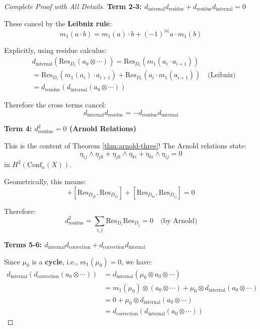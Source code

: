 \begin{proof}[Complete Proof with All Details]
\textbf{Term 2-3: $d_{\text{internal}} d_{\text{residue}} + d_{\text{residue}} d_{\text{internal}} = 0$}

These cancel by the \textbf{Leibniz rule}:
\begin{equation}
m_1(a \cdot b) = m_1(a) \cdot b + (-1)^{|a|} a \cdot m_1(b)
\end{equation}

Explicitly, using residue calculus:
\begin{align}
&d_{\text{internal}}(\text{Res}_{D_i}(a_0 \otimes \cdots)) 
= \text{Res}_{D_i}(m_1(a_i \cdot a_{i+1})) \\
&= \text{Res}_{D_i}(m_1(a_i) \cdot a_{i+1}) + \text{Res}_{D_i}(a_i \cdot m_1(a_{i+1})) 
\quad \text{(Leibniz)} \\
&= d_{\text{residue}}(d_{\text{internal}}(a_0 \otimes \cdots))
\end{align}

Therefore the cross terms cancel: 
$$d_{\text{internal}} d_{\text{residue}} = - d_{\text{residue}} d_{\text{internal}}$$

\textbf{Term 4: $d_{\text{residue}}^2 = 0$ (Arnold Relations)}

This is the content of Theorem \ref{thm:arnold-three}! The Arnold relations state:
\begin{equation}
\eta_{ij} \wedge \eta_{jk} + \eta_{jk} \wedge \eta_{ki} + \eta_{ki} \wedge \eta_{ij} = 0
\end{equation}
in $H^2(\text{Conf}_n(X))$.

Geometrically, this means:
\begin{equation}
[\text{Res}_{D_{ij}}, \text{Res}_{D_{jk}}] + [\text{Res}_{D_{jk}}, \text{Res}_{D_{ki}}] 
+ [\text{Res}_{D_{ki}}, \text{Res}_{D_{ij}}] = 0
\end{equation}

Therefore:
$$d_{\text{residue}}^2 = \sum_{i,j} \text{Res}_{D_i} \text{Res}_{D_j} 
= 0 \quad \text{(by Arnold)}$$

\textbf{Terms 5-6: $d_{\text{internal}} d_{\text{correction}} + d_{\text{correction}} 
d_{\text{internal}}$}

Since $\mu_0$ is a \textbf{cycle}, i.e., $m_1(\mu_0) = 0$, we have:
\begin{align}
d_{\text{internal}}(d_{\text{correction}}(a_0 \otimes \cdots)) 
&= d_{\text{internal}}(\mu_0 \otimes a_0 \otimes \cdots) \\
&= m_1(\mu_0) \otimes (a_0 \otimes \cdots) + \mu_0 \otimes d_{\text{internal}}(a_0 \otimes \cdots) \\
&= 0 + \mu_0 \otimes d_{\text{internal}}(a_0 \otimes \cdots) \\
&= d_{\text{correction}}(d_{\text{internal}}(a_0 \otimes \cdots))
\end{align}


\end{proof}
